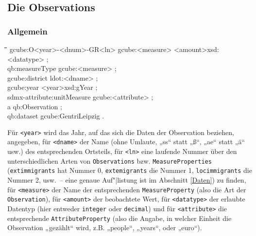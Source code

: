 \documentclass[a4paper,11pt]{article}
\newenvironment{code}{\tt \begin{tabbing}
\hskip12pt\=\hskip12pt\=\hskip12pt\=\hskip12pt\=\hskip5cm\=\hskip5cm\=\kill}
{\end{tabbing}}
\def\ppw{{\char94\char94}}
\begin{document}
\subsection{Die Observations} \label{Observations}

\subsubsection{Allgemein}
\begin{code}
gcube:O<year>-<dnum>-GR<ln> gcube:<measure> {\dq}<amount>{\dq}{\ppw}xsd:<datatype> ;\+\\
    qb:measureType gcube:<measure> ;\\
    gcube:district ldot:<dname> ;\\
    gcube:year {\dq}<year>{\dq}{\ppw}xsd:gYear ;\\
    sdmx-attribute:unitMeasure gcube:<attribute> ;\\
    a qb:Observation ;\\
    qb:dataset gcube:GentriLeipzig .
\end{code}
Für \texttt{<year>} wird das Jahr, auf das sich die Daten der Observation
beziehen, angegeben, für \texttt{<dname>} der Name (ohne Umlaute, „ss“ statt
„ß“, „ae“ statt „ä“ usw.) des entsprechenden Ortsteils, für \texttt{<ln>} eine
laufende Nummer über den unterschiedlichen Arten von \texttt{Observations}
bzw. \texttt{MeasureProperties} (\texttt{extimmigrants} hat Nummer 0,
\texttt{extemigrants} die Nummer 1, \texttt{locimmigrants} die Nummer 2,
usw.\ -- eine genaue Auf"|listung ist im Abschnitt \ref{Daten}) zu finden, für
\texttt{<measure>} der Name der entsprechenden \texttt{MeasureProperty} (also
die Art der \texttt{Observation}), für \texttt{<amount>} der beobachtete Wert,
für \texttt{<datatype>} der erlaubte Datentyp (hier entweder \texttt{integer}
oder \texttt{decimal}) und für \texttt{<attribute>} die entsprechende
\texttt{AttributeProperty} (also die Angabe, in welcher Einheit die Observation
„gezählt“ wird, z.B. „people“, „years“, oder „euro“).
\end{document}
